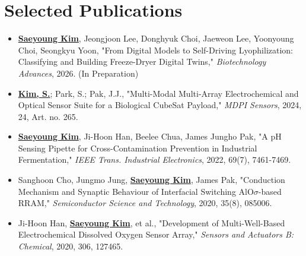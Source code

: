 \documentclass[letterpaper,11pt]{moderncv}
\begin{document}
\section{Selected Publications}
\begin{sloppypar}
\begin{itemize}[leftmargin=1cm, itemsep=0pt, parsep=0pt]
    \item \textbf{\underline{Saeyoung Kim}}, Jeongjoon Lee, Donghyuk Choi, Jaeweon Lee, Yoonyoung Choi, Seongkyu Yoon, "From Digital Models to Self-Driving Lyophilization: Classifying and Building Freeze-Dryer Digital Twins," \textit{Biotechnology Advances}, 2026. (In Preparation)
    \item \textbf{\underline{Kim, S.}}; Park, S.; Pak, J.J., "Multi-Modal Multi-Array Electrochemical and Optical Sensor Suite for a Biological CubeSat Payload," \textit{MDPI Sensors}, 2024, 24, Art. no. 265.
    \item \textbf{\underline{Saeyoung Kim}}, Ji-Hoon Han, Beelee Chua, James Jungho Pak, "A pH Sensing Pipette for Cross-Contamination Prevention in Industrial Fermentation," \textit{IEEE Trans. Industrial Electronics}, 2022, 69(7), 7461-7469.
    \item Sanghoon Cho, Jungmo Jung, \textbf{\underline{Saeyoung Kim}}, James Pak, "Conduction Mechanism and Synaptic Behaviour of Interfacial Switching AlO$\sigma$-based RRAM," \textit{Semiconductor Science and Technology}, 2020, 35(8), 085006.
    \item Ji-Hoon Han, \textbf{\underline{Saeyoung Kim}}, et al., "Development of Multi-Well-Based Electrochemical Dissolved Oxygen Sensor Array," \textit{Sensors and Actuators B: Chemical}, 2020, 306, 127465.
\end{itemize}
\end{sloppypar}

\vfill
{}
\end{document}
